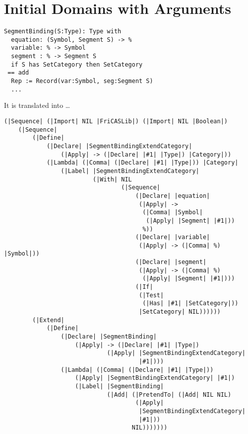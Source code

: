 \documentclass{article}
\begin{document}
\section{Initial Domains with Arguments}
\label{sec:ParametrizedInitDomain}
\begin{verbatim}
SegmentBinding(S:Type): Type with
  equation: (Symbol, Segment S) -> %
  variable: % -> Symbol
  segment : % -> Segment S
  if S has SetCategory then SetCategory
 == add
  Rep := Record(var:Symbol, seg:Segment S)
  ...
\end{verbatim}
It is translated into \ldots
\begin{verbatim}
(|Sequence| (|Import| NIL |FriCASLib|) (|Import| NIL |Boolean|)
    (|Sequence|
        (|Define|
            (|Declare| |SegmentBindingExtendCategory|
                (|Apply| -> (|Declare| |#1| |Type|) |Category|))
            (|Lambda| (|Comma| (|Declare| |#1| |Type|)) |Category|
                (|Label| |SegmentBindingExtendCategory|
                         (|With| NIL
                                 (|Sequence|
                                     (|Declare| |equation|
                                      (|Apply| ->
                                       (|Comma| |Symbol|
                                        (|Apply| |Segment| |#1|))
                                       %))
                                     (|Declare| |variable|
                                      (|Apply| -> (|Comma| %) |Symbol|))
                                     (|Declare| |segment|
                                      (|Apply| -> (|Comma| %)
                                       (|Apply| |Segment| |#1|)))
                                     (|If|
                                      (|Test|
                                       (|Has| |#1| |SetCategory|))
                                      |SetCategory| NIL))))))
        (|Extend|
            (|Define|
                (|Declare| |SegmentBinding|
                    (|Apply| -> (|Declare| |#1| |Type|)
                             (|Apply| |SegmentBindingExtendCategory|
                                      |#1|)))
                (|Lambda| (|Comma| (|Declare| |#1| |Type|))
                    (|Apply| |SegmentBindingExtendCategory| |#1|)
                    (|Label| |SegmentBinding|
                             (|Add| (|PretendTo| (|Add| NIL NIL)
                                     (|Apply|
                                      |SegmentBindingExtendCategory|
                                      |#1|))
                                    NIL)))))))
\end{verbatim}
\end{document}
